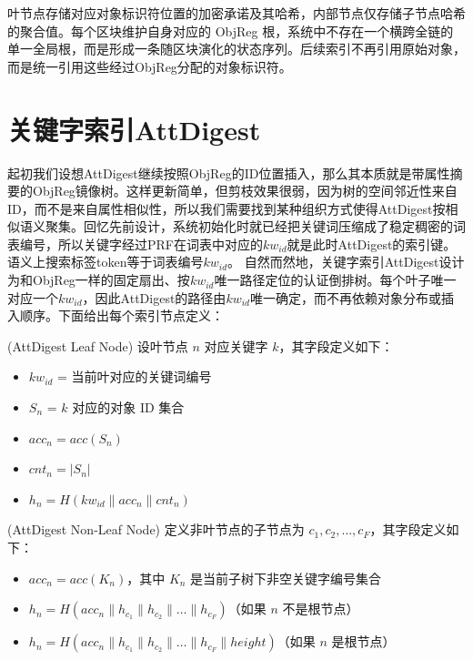 叶节点存储对应对象标识符位置的加密承诺及其哈希，内部节点仅存储子节点哈希的聚合值。每个区块维护自身对应的 ObjReg 根，系统中不存在一个横跨全链的单一全局根，而是形成一条随区块演化的状态序列。后续索引不再引用原始对象，而是统一引用这些经过ObjReg分配的对象标识符。

\section{关键字索引AttDigest}
起初我们设想AttDigest继续按照ObjReg的ID位置插入，那么其本质就是带属性摘要的ObjReg镜像树。这样更新简单，但剪枝效果很弱，因为树的空间邻近性来自ID，而不是来自属性相似性，所以我们需要找到某种组织方式使得AttDigest按相似语义聚集。回忆先前设计，系统初始化时就已经把关键词压缩成了稳定稠密的词表编号，所以关键字经过PRF在词表中对应的$kw_{id}$就是此时AttDigest的索引键。语义上搜索标签token等于词表编号$kw_{id}$。
自然而然地，关键字索引AttDigest设计为和ObjReg一样的固定扇出、按$kw_{id}$唯一路径定位的认证倒排树。每个叶子唯一对应一个$kw_{id}$，因此AttDigest的路径由$kw_{id}$唯一确定，而不再依赖对象分布或插入顺序。下面给出每个索引节点定义：

\begin{definition}
(AttDigest Leaf Node) 设叶节点 \(n\) 对应关键字 \(k\)，其字段定义如下：
\begin{itemize}
    \item \(kw_{id}\) = 当前叶对应的关键词编号
    \item \(S_{n}\) = \(k\) 对应的对象 ID 集合
    \item \(acc_{n} = acc(S_n)\)
    \item \(cnt_n = |S_n|\)
    \item \(h_n = H(kw_{id} \parallel acc_n \parallel cnt_n)\)
\end{itemize}
\end{definition}

\begin{definition}
(AttDigest Non-Leaf Node) 定义非叶节点的子节点为 \(c_1, c_2, \dots, c_F\)，其字段定义如下：
\begin{itemize}
    \item \(acc_n = acc(K_n)\)，其中 \(K_n\) 是当前子树下非空关键字编号集合
    \item \(h_n = H(acc_n \parallel h_{c_1} \parallel h_{c_2} \parallel \dots \parallel h_{c_F})\)（如果 \(n\) 不是根节点）
    \item \(h_n = H(acc_n \parallel h_{c_1} \parallel h_{c_2} \parallel \dots \parallel h_{c_F} \parallel height)\)（如果 \(n\) 是根节点）
\end{itemize}
\end{definition}

